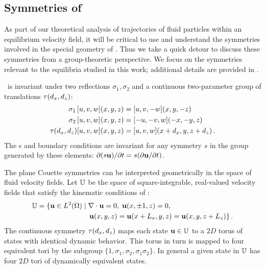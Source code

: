 \documentclass[letter,12pt,openany]{article}
\begin{document}
\subsection{Symmetries of {\pCf}}
\label{s:PCF_symm}

As part of our theoretical analysis of trajectories of fluid particles within an equilibrium velocity field, it will be critical to use and understand the symmetries involved in the special geometry of {\pCf}. Thus we take a quick detour to discuss these symmetries from a group-theoretic perspective. We focus on the symmetries relevant to the equilibria studied in this work; additional details are provided in \cite{HalcrowThesis}.


\PCf\ is invariant under two reflections $\sigma_1,\sigma_2$ and a
continuous two-parameter group of translations $\tau(d_x, d_z)$:
\begin{align}
\sigma_1 \, [u,v,w](x,y,z) &= [u, v,-w](x,y,-z) \nonumber \\
\sigma_2 \, [u,v,w](x,y,z) &= [-u,-v,w](-x,-y,z)  \label{reflSfit1}\\
\tau(d_x, d_z)[u,v,w](x,y,z) &= [u,v,w](x+d_x,y,z+d_z) \nonumber\,.
\end{align}
The \NSe s and boundary conditions are invariant for any symmetry $s$
in the group generated by these elements:
$\partial (s {\bf u}) / \partial t = s (\partial {\bf u} / \partial t)$.

The plane Couette symmetries can be interpreted geometrically in the space of
fluid velocity fields. Let $\mathbb{U}$ be the space of
square-integrable, real-valued velocity fields that satisfy the kinematic
conditions of \pCf:
\begin{align}
 \bbU  &= \{\bu \in L^2(\Omega) \; | \; \grad \cdot \bu = 0,
               \; \bu(x, \pm 1, z) = 0, \notag  \\
         &\phantom{=} {} \qquad \qquad \qquad \; \; %
          \bu(x, y, z) = \bu(x+L_x, y, z) = \bu(x, y, z + L_z)\}  \,.
\end{align} 
The continuous symmetry $\tau(d_x, d_z)$ maps each state
${\bf u} \in \mathbb{U}$ to a $2D$ torus of states with identical dynamic
behavior. This torus in turn is mapped to four equivalent tori by
the subgroup $\{1,\sigma_1,\sigma_2, \sigma_1 \sigma_2\}$. In
general a given state in $\mathbb{U}$ has four $2D$ tori of dynamically
equivalent states.
\end{document}
